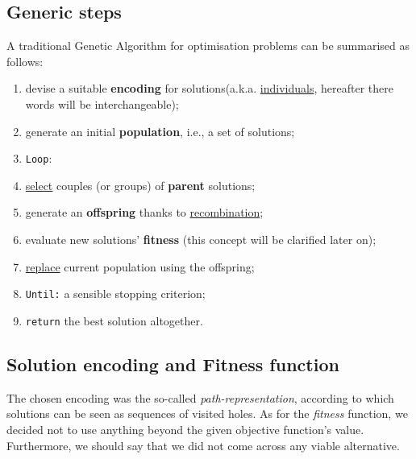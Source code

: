 \documentclass[letterpaper, 10 pt, conference]{ieeeconf}  %
\begin{document}
\subsection{Generic steps} 
A traditional Genetic Algorithm for optimisation problems can be summarised as follows:
\begin{enumerate}
\item devise a suitable \textbf{encoding} for solutions(a.k.a. \underline{individuals}, hereafter there words will be interchangeable);
\item generate an initial \textbf{population}, i.e., a set of solutions;
\item \texttt{Loop}:
\item \hspace*{ 0.2 mm} \underline{select} couples (or groups) of \textbf{parent} solutions;
\item \hspace*{ 0.2 mm} generate an \textbf{offspring} thanks to \underline{recombination};
\item \hspace*{ 0.2 mm} evaluate new solutions' \textbf{fitness} (this concept will be \hspace*{ 0.2 mm} clarified later on);
\item \hspace*{ 0.2 mm} \underline{replace} current population using the offspring;
\item \texttt{Until:} a sensible stopping criterion;
\item \texttt{return} the best solution altogether.
\end{enumerate}

\subsection{Solution encoding and Fitness function}
The chosen encoding was the so-called \textit{path-representation}, according to which solutions can be seen as sequences of visited holes. \newline
As for the \textit{fitness} function, we decided not to use anything beyond the given objective function's value. Furthermore, we should say that we did not come across any viable alternative.
\end{document}
